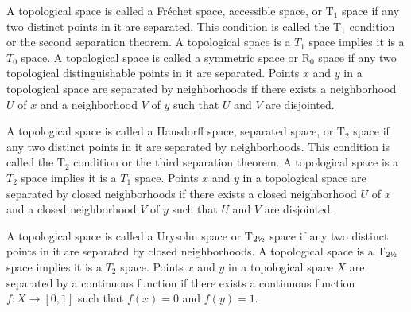 \documentclass[a4paper,12pt]{article}
\begin{document}
A topological space is called a Fréchet space, accessible space, or T$_1$ space if any two distinct points in it are separated. This condition is called the T$_1$ condition or the second separation theorem. A topological space is a $T_1$ space implies it is a $T_0$ space.
A topological space is called a symmetric space or R$_0$ space if any two topological distinguishable points in it are separated.
Points $x$ and $y$ in a topological space are separated by neighborhoods if there exists a neighborhood $U$ of $x$ and a neighborhood $V$ of $y$ such that $U$ and $V$ are disjointed.

A topological space is called a Hausdorff space, separated space, or T$_2$ space if any two distinct points in it are separated by neighborhoods. This condition is called the T$_2$ condition or the third separation theorem. A topological space is a $T_2$ space implies it is a $T_1$ space.
Points $x$ and $y$ in a topological space are separated by closed neighborhoods if there exists a closed neighborhood $U$ of $x$ and a closed neighborhood $V$ of $y$ such that $U$ and $V$ are disjointed.

A topological space is called a Urysohn space or T\(_{2\text{\textonehalf}}\) space if any two distinct points in it are separated by closed neighborhoods. A topological space is a T\(_{2\text{\textonehalf}}\) space implies it is a $T_2$ space.
Points $x$ and $y$ in a topological space $X$ are separated by a continuous function if there exists a continuous function $f\colon X\to [0,1]$ such that $f(x)=0$ and $f(y)=1$.
\end{document}
